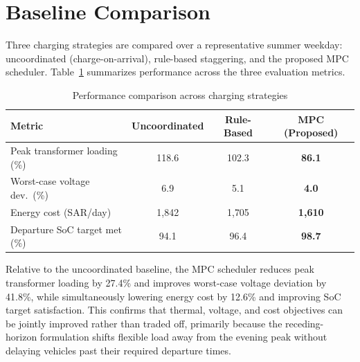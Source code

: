 \section{Baseline Comparison}
Three charging strategies are compared over a representative summer weekday: uncoordinated
(charge-on-arrival), rule-based staggering, and the proposed MPC scheduler. Table~\ref{tab:results}
summarizes performance across the three evaluation metrics.

\begin{table}[htbp]
\centering
\caption{Performance comparison across charging strategies}
\label{tab:results}
\begin{tabular}{@{}lccc@{}}
\toprule
\textbf{Metric} & \textbf{Uncoordinated} & \textbf{Rule-Based} & \textbf{MPC (Proposed)} \\
\midrule
Peak transformer loading (\%) & 118.6 & 102.3 & \textbf{86.1} \\
Worst-case voltage dev.\ (\%) & 6.9 & 5.1 & \textbf{4.0} \\
Energy cost (SAR/day) & 1{,}842 & 1{,}705 & \textbf{1{,}610} \\
Departure SoC target met (\%) & 94.1 & 96.4 & \textbf{98.7} \\
\bottomrule
\end{tabular}
\end{table}

Relative to the uncoordinated baseline, the MPC scheduler reduces peak transformer loading by
27.4\% and improves worst-case voltage deviation by 41.8\%, while simultaneously lowering
energy cost by 12.6\% and improving SoC target satisfaction. This confirms that thermal,
voltage, and cost objectives can be jointly improved rather than traded off, primarily because
the receding-horizon formulation shifts flexible load away from the evening peak without
delaying vehicles past their required departure times.

